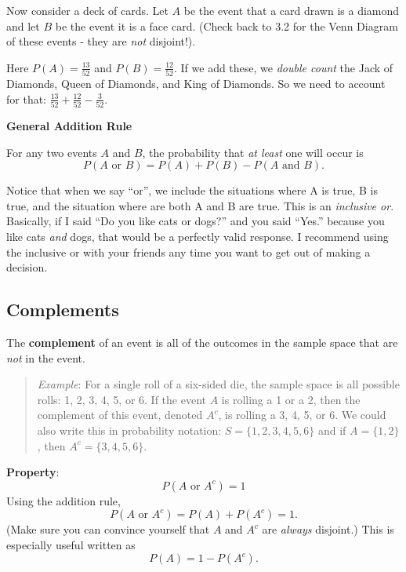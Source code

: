 \documentclass[
]{book}
\begin{document}
Now consider a deck of cards. Let \(A\) be the event that a card drawn is a diamond and let \(B\) be the event it is a face card. (Check back to 3.2 for the Venn Diagram of these events - they are \emph{not} disjoint!).

Here \(P(A)=\frac{13}{52}\) and \(P(B)=\frac{12}{52}\). If we add these, we \emph{double count} the Jack of Diamonds, Queen of Diamonds, and King of Diamonds. So we need to account for that: \(\frac{13}{52}+\frac{12}{52}-\frac{3}{52}\).

\textbf{General Addition Rule}

For any two events \(A\) and \(B\), the probability that \emph{at least} one will occur is \[P(A \text{ or } B) = P(A)+P(B)-P(A \text{ and }B).\]

Notice that when we say ``or'', we include the situations where A is true, B is true, and the situation where are both A and B are true. This is an \emph{inclusive or}. Basically, if I said ``Do you like cats or dogs?'' and you said ``Yes.'' because you like cats \emph{and} dogs, that would be a perfectly valid response. I recommend using the inclusive or with your friends any time you want to get out of making a decision.

\hypertarget{complements}{%
\subsection{Complements}\label{complements}}

The \textbf{complement} of an event is all of the outcomes in the sample space that are \emph{not} in the event.

\begin{quote}
\emph{Example}: For a single roll of a six-sided die, the sample space is all possible rolls: 1, 2, 3, 4, 5, or 6. If the event \(A\) is rolling a 1 or a 2, then the complement of this event, denoted \(A^c\), is rolling a 3, 4, 5, or 6. We could also write this in probability notation: \(S = \{1, 2, 3, 4, 5, 6\}\) and if \(A=\{1,2\}\), then \(A^c=\{3, 4, 5, 6\}\).
\end{quote}

\textbf{Property}: \[P(A \text{ or } A^c)=1\] Using the addition rule, \[P(A \text{ or } A^c) = P(A)+P(A^c) = 1.\] (Make sure you can convince yourself that \(A\) and \(A^c\) are \emph{always} disjoint.) This is especially useful written as \[P(A) = 1-P(A^c).\]
\end{document}

